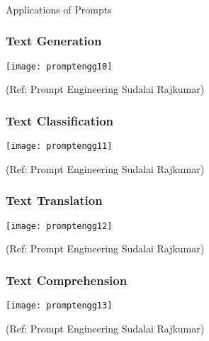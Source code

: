 
\begin{frame}[fragile]\frametitle{}
\begin{center}
{\Large Applications of Prompts}
\end{center}
\end{frame}

\begin{frame}[fragile]\frametitle{Text Generation}

\begin{center}
\texttt{[image: promptengg10]}

{\tiny (Ref: Prompt Engineering Sudalai Rajkumar)}

\end{center}		
		


\end{frame}

\begin{frame}[fragile]\frametitle{Text Classification}

\begin{center}
\texttt{[image: promptengg11]}

{\tiny (Ref: Prompt Engineering Sudalai Rajkumar)}

\end{center}		
		


\end{frame}

\begin{frame}[fragile]\frametitle{Text Translation}

\begin{center}
\texttt{[image: promptengg12]}

{\tiny (Ref: Prompt Engineering Sudalai Rajkumar)}

\end{center}		
		


\end{frame}

\begin{frame}[fragile]\frametitle{Text Comprehension}

\begin{center}
\texttt{[image: promptengg13]}

{\tiny (Ref: Prompt Engineering Sudalai Rajkumar)}

\end{center}		
		


\end{frame}

